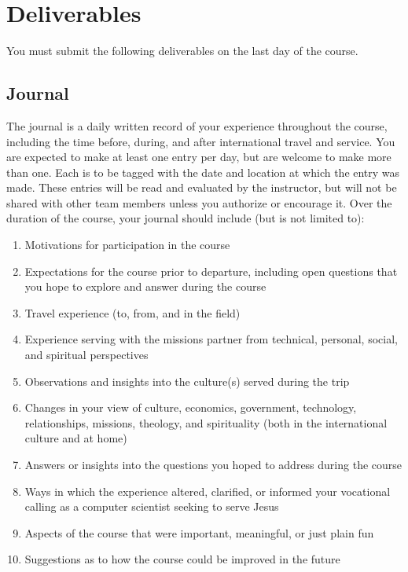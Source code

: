 \documentclass[11pt]{article}
\begin{document}
\section{Deliverables}

You must submit the following deliverables on the last day of the course.

\subsection{Journal}

The journal is a daily written record
of your experience throughout the course,
including the time before, during, and after
international travel and service.
You are expected to make at least one entry per day,
but are welcome to make more than one.
Each is to be tagged with the date and location at which the entry was made.
These entries will be read and evaluated by the instructor,
but will not be shared with other team members
unless you authorize or encourage it.
Over the duration of the course,
your journal should include (but is not limited to):
\begin{enumerate}
\item
  Motivations for participation in the course
\item
  Expectations for the course prior to departure,
  including open questions that you hope to explore and answer during the course
\item
  Travel experience (to, from, and in the field)
\item
  Experience serving with the missions partner
  from technical, personal, social, and spiritual perspectives
\item
  Observations and insights into the culture(s) served during the trip
\item
  Changes in your view of culture, economics, government,
  technology, relationships, missions, theology, and spirituality
  (both in the international culture and at home)
\item
  Answers or insights into the questions you hoped to address during the course
\item
  Ways in which the experience altered, clarified, or informed
  your vocational calling as a computer scientist seeking to serve Jesus
\item
  Aspects of the course that were important, meaningful, or just plain fun
\item
  Suggestions as to how the course could be improved in the future
\end{enumerate}
\end{document}
